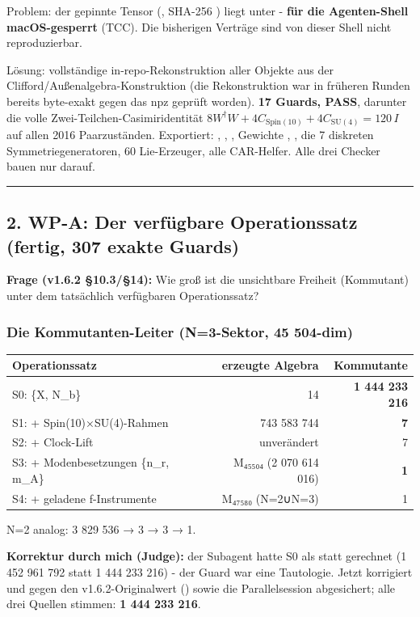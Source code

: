 Problem: der gepinnte Tensor (, SHA-256
) liegt unter 
- \textbf{für die Agenten-Shell macOS-gesperrt} (TCC). Die bisherigen
Verträge sind von dieser Shell nicht reproduzierbar.

Lösung: vollständige in-repo-Rekonstruktion aller Objekte aus der
Clifford/Außenalgebra-Konstruktion (die Rekonstruktion war in früheren
Runden bereits byte-exakt gegen das npz geprüft worden). \textbf{17
Guards, PASS}, darunter die volle Zwei-Teilchen-Casimiridentität
\(8W^\dagger W+4C_{\text{Spin}(10)}+4C_{\text{SU}(4)}=120\,I\) auf allen
2016 Paarzuständen. Exportiert: , ,
, Gewichte , , die 7
diskreten Symmetriegeneratoren, 60 Lie-Erzeuger, alle CAR-Helfer. Alle
drei Checker bauen nur darauf.

\begin{center}\rule{0.5\linewidth}{0.5pt}\end{center}

\subsection{2. WP-A: Der verfügbare Operationssatz (fertig, 307 exakte
Guards)}\label{wp-a-der-verfuxfcgbare-operationssatz-fertig-307-exakte-guards}

\textbf{Frage (v1.6.2 §10.3/§14):} Wie groß ist die unsichtbare Freiheit
(Kommutant) unter dem tatsächlich verfügbaren Operationssatz?

\subsubsection{Die Kommutanten-Leiter (N=3-Sektor, 45
504-dim)}\label{die-kommutanten-leiter-n3-sektor-45-504-dim}

{\def\LTcaptype{none} %
\begin{longtable}[]{@{}lrr@{}}
\toprule\noalign{}
Operationssatz & erzeugte Algebra & Kommutante \\
\midrule\noalign{}
\endhead
\bottomrule\noalign{}
\endlastfoot
S0: \{X, N\_b\} & 14 & \textbf{1 444 233 216} \\
S1: + Spin(10)×SU(4)-Rahmen & 743 583 744 & \textbf{7} \\
S2: + Clock-Lift & unverändert & 7 \\
S3: + Modenbesetzungen \{n\_r, m\_A\} & M₄₅₅₀₄ (2 070 614 016) &
\textbf{1} \\
S4: + geladene f-Instrumente & M₄₇₅₈₀ (N=2∪N=3) & 1 \\
\end{longtable}
}

N=2 analog: 3 829 536 → 3 → 3 → 1.

\textbf{Korrektur durch mich (Judge):} der Subagent hatte S0 als
 statt  gerechnet (1 452 961 792 statt 1
444 233 216) - der Guard war eine Tautologie. Jetzt korrigiert und gegen
den v1.6.2-Originalwert () sowie die
Parallelsession abgesichert; alle drei Quellen stimmen: \textbf{1 444
233 216}.


